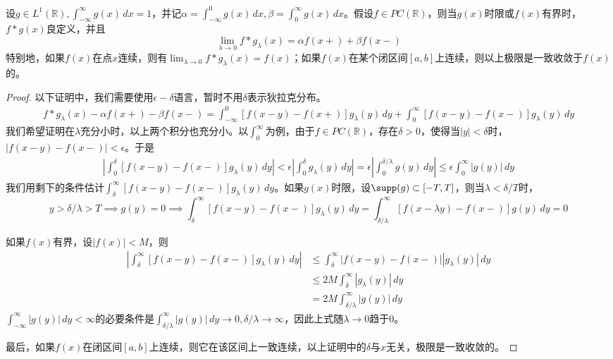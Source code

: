 \begin{theorem}
    设$g\in L^1(\mathbb{R}),\int_{-\infty}^{\infty}g(x)\,dx=1$，并记$\alpha=\int_{-\infty}^{0}g(x)\,dx,\beta=\int_{0}^{\infty}g(x)\,dx$。假设$f\in PC(\mathbb{R})$，则当$g(x)$时限或$f(x)$有界时，$f*g(x)$良定义，并且
    \[\lim_{\lambda\to 0}f*g_\lambda(x)=\alpha f(x+)+\beta f(x-)\]
    特别地，如果$f(x)$在点$x$连续，则有$\lim_{\lambda\to 0}f*g_\lambda(x)=f(x)$；如果$f(x)$在某个闭区间$[a,b]$上连续，则以上极限是一致收敛于$f(x)$的。
\end{theorem}
\begin{proof}
    以下证明中，我们需要使用$\epsilon-\delta$语言，暂时不用$\delta$表示狄拉克分布。
    \begin{align*}
        f*g_\lambda(x)-\alpha f(x+)-\beta f(x-)=\int_{-\infty}^{0}[f(x-y)-f(x+)]g_\lambda(y)\,dy+\int_{0}^{\infty}[f(x-y)-f(x-)]g_\lambda(y)\,dy
    \end{align*}
    我们希望证明在$\lambda$充分小时，以上两个积分也充分小。以$\int_{0}^{\infty}$为例，由于$f\in PC(\mathbb{R})$，存在$\delta>0$，使得当$|y|<\delta$时，$|f(x-y)-f(x-)|<\epsilon$。于是
    \begin{align*}
        \left|\int_{0}^{\delta}[f(x-y)-f(x-)]g_\lambda(y)\,dy\right|
        <\epsilon\left|\int_{0}^{\delta}g_\lambda(y)\,dy\right|=\epsilon\left|\int_{0}^{\delta/\lambda}g(y)\,dy\right|\leq\epsilon\int_{0}^{\infty}|g(y)|\,dy
    \end{align*}
    我们用剩下的条件估计$\int_{\delta}^{\infty}[f(x-y)-f(x-)]g_\lambda(y)\,dy$。如果$g(x)$时限，设$\supp(g)\subset[-T,T]$，则当$\lambda<\delta/T$时，$$y>\delta/\lambda>T\implies g(y)=0\implies\int_{\delta}^{\infty}[f(x-y)-f(x-)]g_\lambda(y)\,dy=\int_{\delta/\lambda}^{\infty}[f(x-\lambda y)-f(x-)]g(y)\,dy=0$$

    如果$f(x)$有界，设$|f(x)|<M$，则
    \begin{align*}
        \left|\int_{\delta}^{\infty}[f(x-y)-f(x-)]g_\lambda(y)\,dy\right| & \leq \int_{\delta}^{\infty}|f(x-y)-f(x-)||g_\lambda(y)|\,dy \\
                                                                          & \leq 2M\int_{\delta}^{\infty}|g_\lambda(y)|\,dy             \\
                                                                          & =2M\int_{\delta/\lambda}^{\infty}|g(y)|\,dy
    \end{align*}
    $\int_{-\infty}^{\infty}|g(y)|\,dy<\infty$的必要条件是$\int_{\delta/\lambda}^{\infty}|g(y)|\,dy\to 0,\delta/\lambda\to\infty$，因此上式随$\lambda\to 0$趋于0。

    最后，如果$f(x)$在闭区间$[a,b]$上连续，则它在该区间上一致连续，以上证明中的$\delta$与$x$无关，极限是一致收敛的。
\end{proof}
